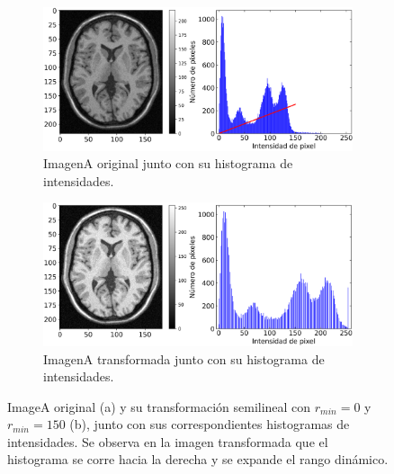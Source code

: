 \documentclass[letterpaper,12pt]{article}
\theoremstyle{plain}
\begin{document}
\begin{figure}[h]
    \centering
         \begin{subfigure}[h]{\linewidth}
            \centering
            \includegraphics[width=\textwidth]{Figuras/ImageA_brute.png}
            \caption{ImagenA original junto con su histograma de intensidades.} 
         \end{subfigure}
         \begin{subfigure}[h]{\linewidth}
            \centering
            \includegraphics[width=\textwidth]{Figuras/ImageA_0_150.png}
            \caption{ImagenA transformada junto con su histograma de intensidades.}
         \end{subfigure}
    \caption{ImageA original (a) y su transformación semilineal con $r_{min} = 0$ y $r_{min} = 150$ (b), junto con sus correspondientes histogramas de intensidades. Se observa en la imagen transformada que el histograma se corre hacia la derecha y se expande el rango dinámico.}
    \label{fig:Semilineartrans}
\end{figure}
\end{document}
